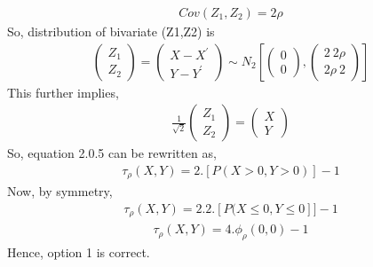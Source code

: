 \documentclass[journal,12pt,twocolumn]{IEEEtran}
\begin{document}
\begin{align}
    Cov(Z_{1},Z_{2}) = 2\rho
\end{align}
So, distribution of bivariate (Z1,Z2) is 
\begin{align}
\begin{pmatrix}Z_{1}\\Z_{2}\end{pmatrix}=\begin{pmatrix}X-X^\prime\\Y-Y^\prime\end{pmatrix} \sim N_{2} \left[\begin{pmatrix}0\\0\end{pmatrix},\begin{pmatrix}2\ 2\rho\\ 2\rho\ 2\end{pmatrix} \right]
\end{align}
This further implies,
\begin{align}
    \frac{1}{\sqrt{2}}\begin{pmatrix}Z_{1}\\Z_{2}\end{pmatrix}=\begin{pmatrix}X\\Y\end{pmatrix}
\end{align}
So, equation 2.0.5 can be rewritten as,
\begin{align}
    \tau_{\rho}(X,Y) = 2.[P(X>0,Y>0)]-1
\end{align}
Now, by symmetry,
\begin{align}
    \tau_{\rho}(X,Y) = 2.2.[P(X\leq0,Y\leq0]]-1
\end{align}
\begin{align}
    \tau_{\rho}(X,Y) = 4.\phi_{\rho}(0,0)-1
\end{align}
Hence, option 1 is correct.
\end{document}
